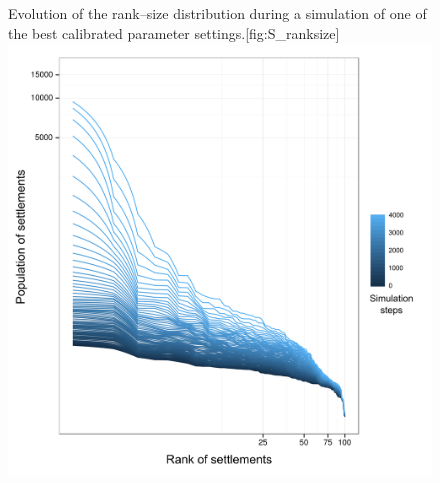 \begin{figure}[!htbp]
\begin{sidecaption}{Evolution of the rank–size distribution during a simulation of one of the best calibrated parameter settings.}[fig:S_ranksize]
  \centering
 \includegraphics[width=1.0\linewidth]{RTbleu.png}
  \end{sidecaption}
\end{figure}

